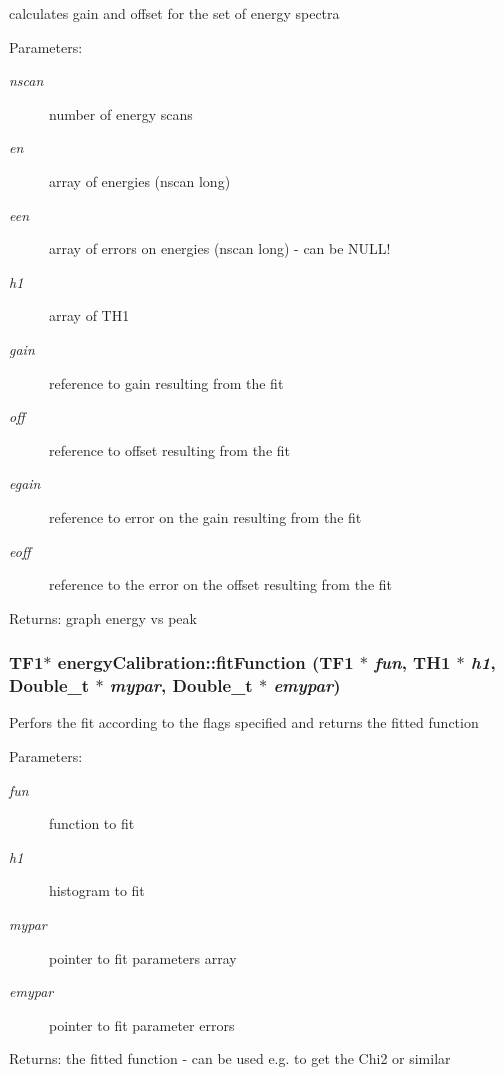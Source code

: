 calculates gain and offset for the set of energy spectra \begin{Desc}
\item[Parameters:]
\begin{description}
\item[{\em nscan}]number of energy scans \item[{\em en}]array of energies (nscan long) \item[{\em een}]array of errors on energies (nscan long) - can be NULL! \item[{\em h1}]array of TH1 \item[{\em gain}]reference to gain resulting from the fit \item[{\em off}]reference to offset resulting from the fit \item[{\em egain}]reference to error on the gain resulting from the fit \item[{\em eoff}]reference to the error on the offset resulting from the fit \end{description}
\end{Desc}
\begin{Desc}
\item[Returns:]graph energy vs peak \end{Desc}
\subsubsection{\setlength{\rightskip}{0pt plus 5cm}TF1$\ast$ energy\-Calibration::fit\-Function (TF1 $\ast$ {\em fun}, TH1 $\ast$ {\em h1}, Double\_\-t $\ast$ {\em mypar}, Double\_\-t $\ast$ {\em emypar})\hspace{0.3cm}{\tt  [private]}}\label{classenergyCalibration_fe1c6dc5f56d12fe06569f401da19729}


Perfors the fit according to the flags specified and returns the fitted function \begin{Desc}
\item[Parameters:]
\begin{description}
\item[{\em fun}]function to fit \item[{\em h1}]histogram to fit \item[{\em mypar}]pointer to fit parameters array \item[{\em emypar}]pointer to fit parameter errors \end{description}
\end{Desc}
\begin{Desc}
\item[Returns:]the fitted function - can be used e.g. to get the Chi2 or similar \end{Desc}
